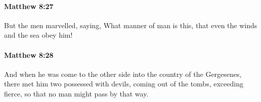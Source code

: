 		\paragraph{Matthew 8:27} %
			\label{MATTHEW-8-27}

			But the men marvelled, saying, What manner of man is this, that even the winds and the sea obey him!

			\begin{framed}
			\scriptsize
				\begin{compactdesc}
					\item[SBLG] 
				\end{compactdesc}
			\end{framed}

		\paragraph{Matthew 8:28} %
			\label{MATTHEW-8-28}

			And when he was come to the other side into the country of the Gergesenes, there met him two possessed with devils, coming out of the tombs, exceeding fierce, so that no man might pass by that way.

